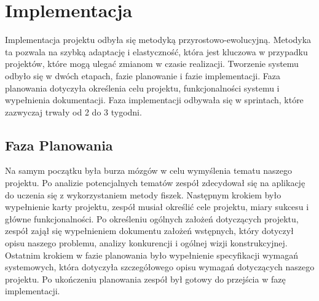 \chapter{Implementacja}

Implementacja projektu odbyła się metodyką przyrostowo-ewolucyjną. Metodyka ta pozwala na szybką adaptację i elastyczność, która jest kluczowa w przypadku projektów, które mogą ulegać zmianom w czasie realizacji. Tworzenie systemu odbyło się w dwóch etapach, fazie planowanie i fazie implementacji. Faza planowania dotyczyła określenia celu projektu, funkcjonalności systemu i wypełnienia dokumentacji. Faza implementacji odbywała się w sprintach, które zazwyczaj trwały od 2 do 3 tygodni.

\section{Faza Planowania}
Na samym początku była burza mózgów w celu wymyślenia tematu naszego projektu. Po analizie potencjalnych tematów zespół zdecydował się na aplikację do uczenia się z wykorzystaniem metody fiszek. Następnym krokiem było wypełnienie karty projektu, zespół musiał określić cele projektu, miary sukcesu i główne funkcjonalności. Po określeniu ogólnych założeń dotyczących projektu, zespół zajął się wypełnieniem dokumentu założeń wstępnych, który dotyczył opisu naszego problemu, analizy konkurencji i ogólnej wizji konstrukcyjnej. Ostatnim krokiem w fazie planowania było wypełnienie specyfikacji wymagań systemowych, która dotyczyła szczegółowego opisu wymagań dotyczących naszego projektu. Po ukończeniu planowania zespół był gotowy do przejścia w fazę implementacji.





